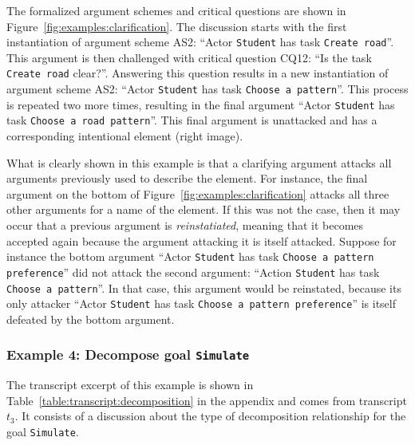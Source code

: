 The formalized argument schemes and critical questions are shown in Figure~\ref{fig:examples:clarification}. The discussion starts with the first instantiation of argument scheme AS2: ``Actor \texttt{Student} has task \texttt{Create road}''. This argument is then challenged with critical question CQ12: ``Is the task \texttt{Create road} clear?''. Answering this question results in a new instantiation of argument scheme AS2: ``Actor \texttt{Student} has task \texttt{Choose a pattern}''. This process is repeated two more times, resulting in the final argument ``Actor \texttt{Student} has task \texttt{Choose a road pattern}''. This final argument is unattacked and has a corresponding intentional element (right image). 

What is clearly shown in this example is that a clarifying argument attacks all arguments previously used to describe the element. For instance, the final argument on the bottom of Figure~\ref{fig:examples:clarification} attacks all three other arguments for a name of the element. If this was not the case, then it may occur that a previous argument is \emph{reinstatiated}, meaning that it becomes accepted again because the argument attacking it is itself attacked. Suppose for instance the bottom argument ``Actor \texttt{Student} has task \texttt{Choose a pattern preference}'' did not attack the second argument: ``Action \texttt{Student} has task \texttt{Choose a pattern}''. In that case, this argument would be reinstated, because its only attacker ``Actor \texttt{Student} has task \texttt{Choose a pattern preference}'' is itself defeated by the bottom argument.

\subsubsection{Example 4: Decompose goal \texttt{Simulate}}

The transcript excerpt of this example is shown in Table~\ref{table:transcript:decomposition} in the appendix and comes from transcript $t_3$. It consists of a discussion about the type of decomposition relationship for the goal \texttt{Simulate}.

